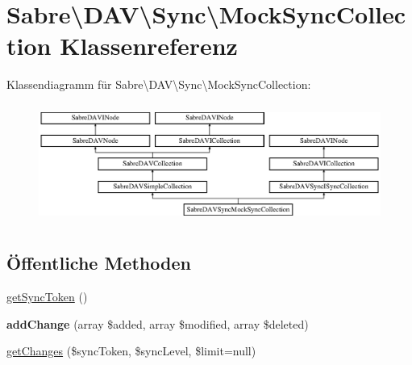 \hypertarget{class_sabre_1_1_d_a_v_1_1_sync_1_1_mock_sync_collection}{}\section{Sabre\textbackslash{}D\+AV\textbackslash{}Sync\textbackslash{}Mock\+Sync\+Collection Klassenreferenz}
\label{class_sabre_1_1_d_a_v_1_1_sync_1_1_mock_sync_collection}
Klassendiagramm für Sabre\textbackslash{}D\+AV\textbackslash{}Sync\textbackslash{}Mock\+Sync\+Collection\+:\begin{figure}[H]
\begin{center}
\leavevmode
\includegraphics[height=3.921569cm]{class_sabre_1_1_d_a_v_1_1_sync_1_1_mock_sync_collection}
\end{center}
\end{figure}
\subsection*{Öffentliche Methoden}
\begin{DoxyCompactItemize}
\item 
\mbox{\hyperlink{class_sabre_1_1_d_a_v_1_1_sync_1_1_mock_sync_collection_a9fc3b8d7c6e94be4c34c9b2761494f9c}{get\+Sync\+Token}} ()
\item 
\mbox{\label{class_sabre_1_1_d_a_v_1_1_sync_1_1_mock_sync_collection_aee1ed27ed63ba11166d91f591ff30c2f}} 
{\bfseries add\+Change} (array \$added, array \$modified, array \$deleted)
\item 
\mbox{\hyperlink{class_sabre_1_1_d_a_v_1_1_sync_1_1_mock_sync_collection_a22c2494bef62d74a044ee7b6f79c4f2f}{get\+Changes}} (\$sync\+Token, \$sync\+Level, \$limit=null)
\end{DoxyCompactItemize}
